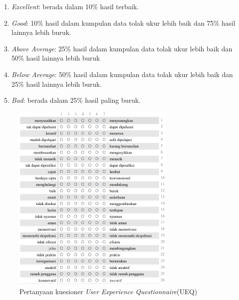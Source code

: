 \begin{enumerate}
	\item \textit{Excellent}: berada dalam 10\% hasil terbaik.
	\item \textit{Good}: 10\% hasil dalam kumpulan data tolak ukur lebih baik dan 75\% hasil lainnya lebih buruk. 
	\item \textit{Above Average}: 25\% hasil dalam kumpulan data tolak ukur lebih baik dan 50\% hasil lainnya lebih buruk 
	\item \textit{Below Average}: 50\% hasil dalam kumpulan data tolak ukur lebih baik dan 25\% hasil lainnya lebih buruk. 
	\item \textit{ Bad}: berada dalam 25\% hasil paling buruk. 
\end{enumerate}
\begin{figure}[H]
	\centering
	\includegraphics[width=8cm]{contents/chapter-2/images/UEQ-1.png}
	\caption[Caption]{Pertanyaan kuesioner \textit{User Experience Questionnaire}(UEQ)}
	\label{Fig:UEQ}
\end{figure}


